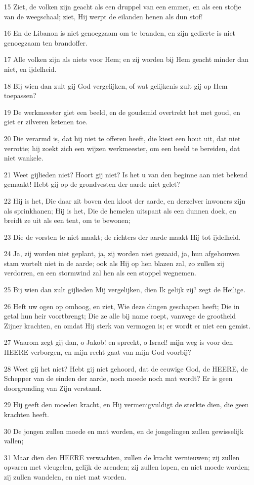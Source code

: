 \par 15 Ziet, de volken zijn geacht als een druppel van een emmer, en als een stofje van de weegschaal; ziet, Hij werpt de eilanden henen als dun stof!
\par 16 En de Libanon is niet genoegzaam om te branden, en zijn gedierte is niet genoegzaam ten brandoffer.
\par 17 Alle volken zijn als niets voor Hem; en zij worden bij Hem geacht minder dan niet, en ijdelheid.
\par 18 Bij wien dan zult gij God vergelijken, of wat gelijkenis zult gij op Hem toepassen?
\par 19 De werkmeester giet een beeld, en de goudsmid overtrekt het met goud, en giet er zilveren ketenen toe.
\par 20 Die verarmd is, dat hij niet te offeren heeft, die kiest een hout uit, dat niet verrotte; hij zoekt zich een wijzen werkmeester, om een beeld te bereiden, dat niet wankele.
\par 21 Weet gijlieden niet? Hoort gij niet? Is het u van den beginne aan niet bekend gemaakt! Hebt gij op de grondvesten der aarde niet gelet?
\par 22 Hij is het, Die daar zit boven den kloot der aarde, en derzelver inwoners zijn als sprinkhanen; Hij is het, Die de hemelen uitspant als een dunnen doek, en breidt ze uit als een tent, om te bewonen;
\par 23 Die de vorsten te niet maakt; de richters der aarde maakt Hij tot ijdelheid.
\par 24 Ja, zij worden niet geplant, ja, zij worden niet gezaaid, ja, hun afgehouwen stam wortelt niet in de aarde; ook als Hij op hen blazen zal, zo zullen zij verdorren, en een stormwind zal hen als een stoppel wegnemen.
\par 25 Bij wien dan zult gijlieden Mij vergelijken, dien Ik gelijk zij? zegt de Heilige.
\par 26 Heft uw ogen op omhoog, en ziet, Wie deze dingen geschapen heeft; Die in getal hun heir voortbrengt; Die ze alle bij name roept, vanwege de grootheid Zijner krachten, en omdat Hij sterk van vermogen is; er wordt er niet een gemist.
\par 27 Waarom zegt gij dan, o Jakob! en spreekt, o Israel! mijn weg is voor den HEERE verborgen, en mijn recht gaat van mijn God voorbij?
\par 28 Weet gij het niet? Hebt gij niet gehoord, dat de eeuwige God, de HEERE, de Schepper van de einden der aarde, noch moede noch mat wordt? Er is geen doorgronding van Zijn verstand.
\par 29 Hij geeft den moeden kracht, en Hij vermenigvuldigt de sterkte dien, die geen krachten heeft.
\par 30 De jongen zullen moede en mat worden, en de jongelingen zullen gewisselijk vallen;
\par 31 Maar dien den HEERE verwachten, zullen de kracht vernieuwen; zij zullen opvaren met vleugelen, gelijk de arenden; zij zullen lopen, en niet moede worden; zij zullen wandelen, en niet mat worden.

